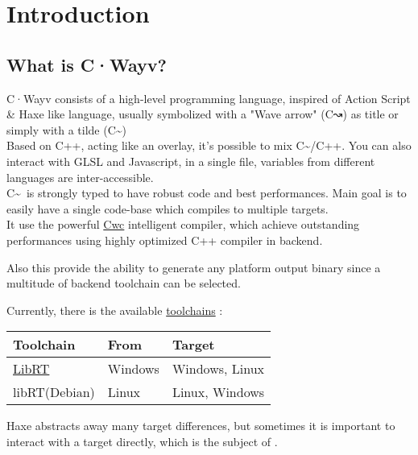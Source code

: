 ﻿\chapter{Introduction}
\label{introduction}

\section{ What is C·Wayv?}
\label{introduction-what-is-C-Wayv}

 C·Wayv consists of a high-level programming language, inspired of Action Script \& Haxe like language, usually symbolized with a "Wave arrow" (C↝) as title or simply with a tilde (C\textasciitilde) \\


Based on C++, acting like an overlay, it's possible to mix C\textasciitilde/C++. You can also interact with GLSL and Javascript, in a single file, variables from different languages are inter-accessible.\\

C\textasciitilde\, is strongly typed to have robust code and best performances. Main goal is to easily have a single code-base which compiles to multiple targets.\\

It use the powerful \href{https://github.com/VLiance/Cwc}{Cwc} intelligent compiler, which achieve outstanding performances using highly optimized C++ compiler in backend. 

Also this provide the ability to generate any platform output binary since a multitude of backend toolchain can be selected.

Currently, there is the available \href{https://github.com/VLianceTool}{toolchains} :
 
\begin{center}
\begin{tabular}{|l | l | l|}
	\hline
	Toolchain &  From &  Target \\ \hline
	\href{https://github.com/VLianceTool/LibRT}{LibRT}  & Windows & Windows, Linux \\
	libRT(Debian) & Linux & Linux, Windows \\ \hline
\end{tabular}
\end{center}


Haxe abstracts away many target differences, but sometimes it is important to interact with a target directly, which is the subject of .


